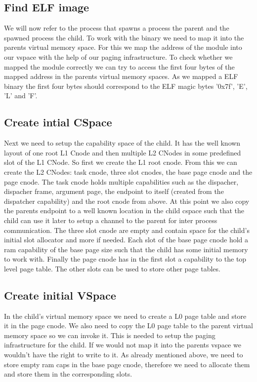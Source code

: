 \subsection{Find ELF image} 

We will now refer to the process that spawns a
process the parent and the spawned process the child.  To work with the binary
we need to map it into the parents virtual memory space. For this we map the
address of the module into our vspace with the help of our paging
infrastructure.  To check whether we mapped the module correctly we can try to
access the first four bytes of the mapped address in the parents virtual memory
spaces. As we mapped a ELF binary the first four bytes should correspond to 
the ELF magic bytes '0x7f', 'E', 'L' and 'F'.

\subsection{Create intial CSpace} 

Next we need to setup the capability space of
the child. It has the well known layout of one root L1 Cnode and then multiple
L2 CNodes in some predefined slot of the L1 CNode.  So first we create the L1
root cnode. From this we can create the L2 CNodes: task cnode, three slot
cnodes, the base page cnode and the page cnode.  The task cnode holds multiple
capabilities such as the dispacher, dispacher frame, argument page, the endpoint
to itself (created from the dispatcher capability) and the root cnode from
above.  At this point we also copy the parents endpoint to a well known location
in the child cspace such that the child can use it later to setup a channel to
the parent for inter process communication.  The three slot cnode are empty and
contain space for the child's initial slot allocator and more if needed.  Each
slot of the base page cnode hold a ram capability of the base page size such
that the child has some initial memory to work with.  Finally the page cnode has
in the first slot a capability to the top level page table. The other slots can
be used to store other page tables.

\subsection{Create initial VSpace} 

In the child's virtual memory space we need
to create a L0 page table and store it in the page cnode. We also need to copy
the L0 page table to the parent virtual memory space so we can invoke it. This
is needed to setup the paging infrastructure for the child. If we would not map
it into the parents vspace we wouldn't have the right to write to it.  As
already mentioned above, we need to store empty ram caps in the base page cnode,
therefore we need to allocate them and store them in the corresponding slots.

